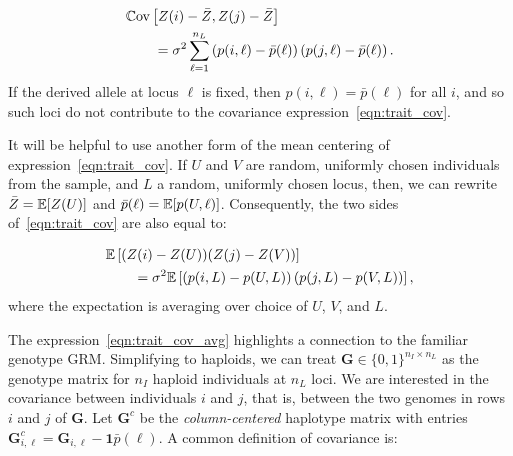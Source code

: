 \begin{align} \label{eqn:trait_cov}
    \begin{split}
        &\mathbb{C}\text{ov}\left[Z(i) - \bar{Z}, Z(j) - \bar{Z}\right] \\
        &\qquad = \sigma^2 \sum_{\ell=1}^{n_L}
            \left(p(i,\ell) - \bar{p}(\ell)\right) \left(p(j,\ell) - \bar{p}(\ell)\right).
    \end{split}
\end{align}
%
If the derived allele at locus $\ell$ is fixed,
then $p(i,\ell) = \bar{p}(\ell)$ for all $i$,
and so such loci do not contribute to the covariance expression~\eqref{eqn:trait_cov}.

It will be helpful to use another form of the mean centering
of expression~\eqref{eqn:trait_cov}.
%
If $U$ and $V$ are random, uniformly chosen individuals from the sample,
and $L$ a random, uniformly chosen locus,
then, we can rewrite $\bar Z = \mathbb{E}[Z(U)]$ and $\bar p(\ell) = \mathbb{E}[p(U,\ell)]$.
%
Consequently, the two sides of~\eqref{eqn:trait_cov}
are also equal to:
%

\begin{align} \label{eqn:trait_cov_avg}
    \begin{split}
        &\mathbb{E}\left[(Z(i) - Z(U))(Z(j) - Z(V)\right)] \\
        &\qquad = \sigma^2 \mathbb{E}\left[
            \left(p(i,L) - p(U,L)\right) \left(p(j,L) - p(V,L)\right)
        \right] ,
    \end{split}
\end{align}
%
where the expectation is averaging over choice of $U$, $V$, and $L$.


The expression~\eqref{eqn:trait_cov_avg}
highlights a connection to the familiar genotype GRM.
%
Simplifying to haploids, we can treat
$\mathbf{G} \in \{0, 1\}^{n_I \times n_L}$ as the genotype matrix
for $n_I$ haploid individuals at $n_L$ loci.
%
We are interested in the covariance between individuals $i$ and $j$,
that is, between the two genomes in rows $i$ and $j$ of $\mathbf{G}$.
%
Let $\mathbf{G}^c$ be the \textit{column-centered} haplotype matrix with
entries $\mathbf{G}^c_{i,\ell} = \mathbf{G}_{i,\ell} - \mathbf{1}\bar{p}(\ell)$.
%
A common definition of covariance is:

